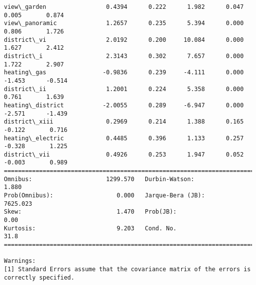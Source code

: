 \documentclass[11pt]{article}
\begin{document}
\begin{Verbatim}[commandchars=\\\{\}]
view\_garden                 0.4394      0.222      1.982      0.047       0.005       0.874
view\_panoramic              1.2657      0.235      5.394      0.000       0.806       1.726
district\_vi                 2.0192      0.200     10.084      0.000       1.627       2.412
district\_i                  2.3143      0.302      7.657      0.000       1.722       2.907
heating\_gas                -0.9836      0.239     -4.111      0.000      -1.453      -0.514
district\_ii                 1.2001      0.224      5.358      0.000       0.761       1.639
heating\_district           -2.0055      0.289     -6.947      0.000      -2.571      -1.439
district\_xiii               0.2969      0.214      1.388      0.165      -0.122       0.716
heating\_electric            0.4485      0.396      1.133      0.257      -0.328       1.225
district\_vii                0.4926      0.253      1.947      0.052      -0.003       0.989
==============================================================================
Omnibus:                     1299.570   Durbin-Watson:                   1.880
Prob(Omnibus):                  0.000   Jarque-Bera (JB):             7625.023
Skew:                           1.470   Prob(JB):                         0.00
Kurtosis:                       9.203   Cond. No.                         31.8
==============================================================================

Warnings:
[1] Standard Errors assume that the covariance matrix of the errors is correctly specified.

    \end{Verbatim}
\end{document}
